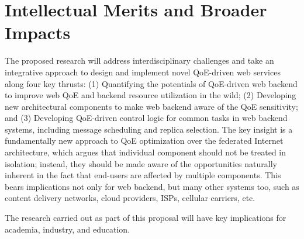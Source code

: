 \section{Intellectual Merits and Broader Impacts}

The proposed research will address interdisciplinary challenges and take an integrative approach to design and implement novel QoE-driven web services along four key thrusts: 
(1) Quantifying the potentials of QoE-driven web backend to improve web QoE and backend resource utilization in the wild;
(2) Developing new architectural components to make web backend aware of the QoE sensitivity; and
(3) Developing QoE-driven control logic for common tasks in web backend systems, including message scheduling and replica selection.
The key insight is a fundamentally new approach to QoE optimization over the federated Internet architecture, which argues that individual component should not be treated in isolation; instead, they should be made aware of the opportunities naturally inherent in the fact that end-users are affected by multiple components. 
This bears implications not only for web backend, but many other systems too, such as content delivery networks, cloud providers, ISPs, cellular carriers, etc.

The research carried out as part of this proposal will have key implications for academia, industry, and education.


